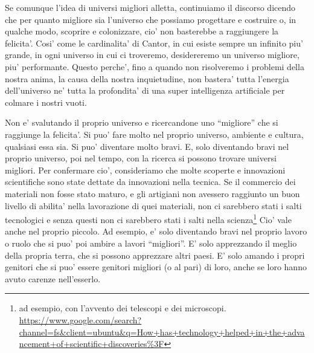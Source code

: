 Se comunque l'idea di universi migliori alletta, continuiamo il discorso dicendo che per quanto migliore sia l'universo che possiamo progettare e costruire o, in qualche modo, scoprire e colonizzare, cio' non basterebbe a raggiungere la felicita'. Cosi' come le cardinalita' di Cantor, in cui esiste sempre un infinito piu' grande, in ogni universo in cui ci troveremo, desidereremo un universo migliore, piu' performante. Questo perche', fino a quando non risolveremo i problemi della nostra anima, la causa della nostra inquietudine, non bastera' tutta l'energia dell'universo ne' tutta la profondita' di una super intelligenza artificiale per colmare i nostri vuoti. 

Non e' svalutando il proprio universo e ricercandone uno ``migliore'' che si raggiunge la felicita'. Si puo' fare molto nel proprio universo, ambiente e cultura, qualsiasi essa sia. Si puo' diventare molto bravi. E, solo diventando bravi nel proprio universo, poi nel tempo, con la ricerca si possono trovare universi migliori.
Per confermare cio', consideriamo che molte scoperte e innovazioni scientifiche sono state dettate da innovazioni nella tecnica. Se il commercio dei materiali non fosse stato maturo, e gli artigiani non avessero raggiunto un buon livello di abilita' nella lavorazione di quei materiali, non ci sarebbero stati i salti tecnologici e senza questi non ci sarebbero stati i salti nella scienza\footnote{ad esempio, con l'avvento dei telescopi e dei microscopi. \url{https://www.google.com/search?channel=fs&client=ubuntu\&q=How+has+technology+helped+in+the+advancement+of+scientific+discoveries\%3F}}
Cio' vale anche nel proprio piccolo. Ad esempio, e' solo diventando bravi nel proprio lavoro o ruolo che si puo' poi ambire a lavori ``migliori''. E' solo apprezzando il meglio della propria terra, che si possono apprezzare altri paesi. E' solo amando i propri genitori che si puo' essere genitori migliori (o al pari) di loro, anche se loro hanno avuto carenze nell'esserlo.


